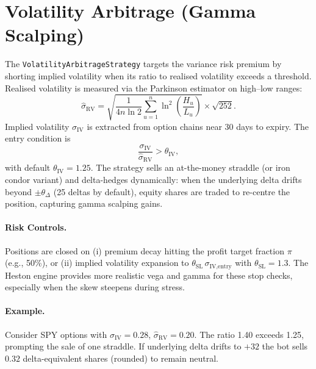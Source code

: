 \section{Volatility Arbitrage (Gamma Scalping)}
The \texttt{VolatilityArbitrageStrategy} targets the variance risk premium by shorting implied volatility when its ratio to realised volatility exceeds a threshold. Realised volatility is measured via the Parkinson estimator on high--low ranges:
\begin{equation}
\widehat{\sigma}_{\text{RV}} = \sqrt{\frac{1}{4n\ln 2} \sum_{u=1}^{n} \ln^2\!\left(\frac{H_u}{L_u}\right)} \times \sqrt{252}.
\end{equation}
Implied volatility $\sigma_{\text{IV}}$ is extracted from option chains near 30 days to expiry. The entry condition is
\begin{equation}
\frac{\sigma_{\text{IV}}}{\widehat{\sigma}_{\text{RV}}} > \theta_{\text{IV}},
\end{equation}
with default $\theta_{\text{IV}} = 1.25$. The strategy sells an at-the-money straddle (or iron condor variant) and delta-hedges dynamically: when the underlying delta drifts beyond $\pm \theta_\Delta$ (25 deltas by default), equity shares are traded to re-centre the position, capturing gamma scalping gains.

\paragraph{Risk Controls.} Positions are closed on (i) premium decay hitting the profit target fraction $\pi$ (e.g., 50\%), or (ii) implied volatility expansion to $\theta_{\text{SL}}\,\sigma_{\text{IV,entry}}$ with $\theta_{\text{SL}}=1.3$. The Heston engine provides more realistic vega and gamma for these stop checks, especially when the skew steepens during stress.

\paragraph{Example.} Consider SPY options with $\sigma_{\text{IV}}=0.28$, $\widehat{\sigma}_{\text{RV}}=0.20$. The ratio 1.40 exceeds 1.25, prompting the sale of one straddle. If underlying delta drifts to $+32$ the bot sells $0.32$ delta-equivalent shares (rounded) to remain neutral.
